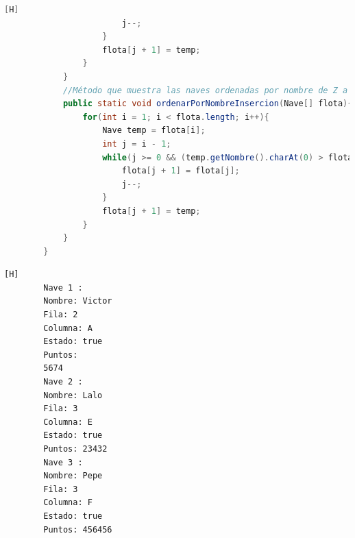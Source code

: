 \documentclass{article}
\begin{document}
\begin{lstlisting}[language=java,caption={Las lineas de codigo de lo creado:}][H]
						j--;
					}
					flota[j + 1] = temp;
				}
			}
			//Método que muestra las naves ordenadas por nombre de Z a A
			public static void ordenarPorNombreInsercion(Nave[] flota){ //Este metodo ordenarPorNombreInsercion() consiste en recorrer todo el array comenzando desde el segundo elemento hasta el final. Para cada elemento, se trata de colocarlo en el lugar correcto entre todos los elementos con que sean menores a z anteriores a él y asi por cada uno completando por cada incial de cada nombre de la Z hasta A
				for(int i = 1; i < flota.length; i++){
					Nave temp = flota[i];
					int j = i - 1;
					while(j >= 0 && (temp.getNombre().charAt(0) > flota[j].getNombre().charAt(0))){
						flota[j + 1] = flota[j];
						j--;
					}
					flota[j + 1] = temp;
				}  
			}
		}
	\end{lstlisting}
    \begin{lstlisting}[language=bash,caption={La ejecucion del codigo completo:}][H]
		Nave 1 : 
		Nombre: Victor
		Fila: 2
		Columna: A
		Estado: true
		Puntos: 
		5674
		Nave 2 : 
		Nombre: Lalo
		Fila: 3
		Columna: E
		Estado: true
		Puntos: 23432
		Nave 3 : 
		Nombre: Pepe 
		Fila: 3
		Columna: F
		Estado: true
		Puntos: 456456


\end{lstlisting}
\end{document}
